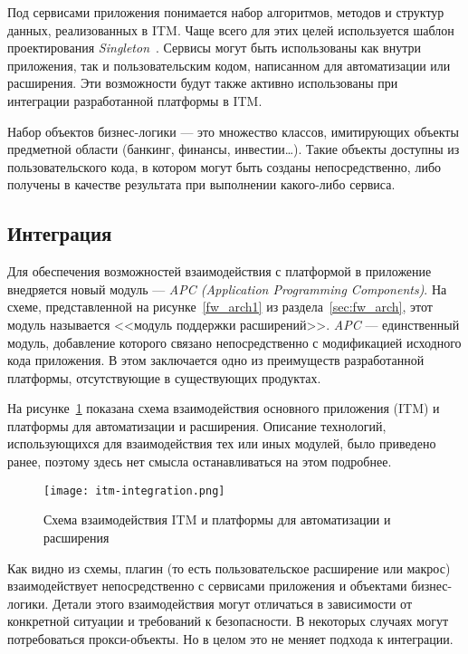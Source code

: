 Под сервисами приложения понимается набор алгоритмов, методов и структур данных, реализованных в ITM. Чаще всего для этих целей используется шаблон проектирования {\it Singleton}~\cite{band-four}. Сервисы могут быть использованы как внутри приложения, так и пользовательским кодом, написанном для автоматизации или расширения. Эти возможности будут также активно использованы при интеграции разработанной платформы в ITM.

Набор объектов бизнес-логики --- это множество классов, имитирующих объекты предметной области (банкинг, финансы, инвестии\dots). Такие объекты доступны из пользовательского кода, в котором могут быть созданы непосредственно, либо получены в качестве результата при выполнении какого-либо сервиса.

\subsection{Интеграция}

Для обеспечения возможностей взаимодействия с платформой в приложение внедряется новый модуль --- {\it APC (Application Programming Components)}. На схеме, представленной на рисунке~\ref{fw_arch1} из раздела~\ref{sec:fw_arch}, этот модуль называется <<модуль поддержки расширений>>. {\it APC} --- единственный модуль, добавление которого связано непосредственно с модификацией исходного кода приложения. В этом заключается одно из преимуществ разработанной платформы, отсутствующие в существующих продуктах.

На рисунке~\ref{pic:itm-integration} показана схема взаимодействия основного приложения (ITM) и платформы для автоматизации и расширения. Описание технологий, использующихся для взаимодействия тех или иных модулей, было приведено ранее, поэтому здесь нет смысла останавливаться на этом подробнее.

\begin{figure}[!h]
    \centering
    \texttt{[image: itm-integration.png]}
    \caption{Схема взаимодействия ITM и платформы для автоматизации и расширения}
    \label{pic:itm-integration}
\end{figure}

Как видно из схемы, плагин (то есть пользовательское расширение или макрос) взаимодействует непосредственно с сервисами приложения и объектами бизнес-логики. Детали этого взаимодействия могут отличаться в зависимости от конкретной ситуации и требований к безопасности. В некоторых случаях могут потребоваться прокси-объекты. Но в целом это не меняет подхода к интеграции.

